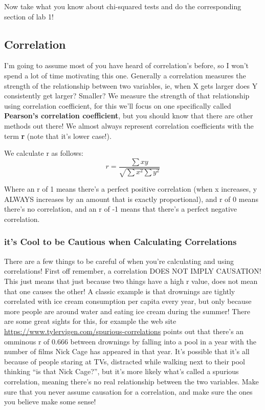 \documentclass[
]{article}
\begin{document}
Now take what you know about chi-squared tests and do the corresponding
section of lab 1!

\hypertarget{correlation}{%
\subsection{Correlation}\label{correlation}}

I'm going to assume most of you have heard of correlation's before, so I
won't spend a lot of time motivating this one. Generally a correlation
measures the strength of the relationship between two variables, ie,
when X gets larger does Y consistently get larger? Smaller? We measure
the strength of that relationship using correlation coefficient, for
this we'll focus on one specifically called \textbf{Pearson's
correlation coefficient}, but you should know that there are other
methods out there! We almost always represent correlation coefficients
with the term \textbf{r} (note that it's lower case!).

We calculate r as follows:
\[r=\frac{\sum{xy}}{\sqrt{\sum{x^2}\sum{y^2}}}\]

Where an r of 1 means there's a perfect positive correlation (when x
increases, y ALWAYS increases by an amount that is exactly
proportional), and r of 0 means there's no correlation, and an r of -1
means that there's a perfect negative correlation.

\hypertarget{its-cool-to-be-cautious-when-calculating-correlations}{%
\subsubsection{it's Cool to be Cautious when Calculating
Correlations}\label{its-cool-to-be-cautious-when-calculating-correlations}}

There are a few things to be careful of when you're calculating and
using correlations! First off remember, a correlation DOES NOT IMPLY
CAUSATION! This just means that just because two things have a high r
value, does not mean that one causes the other! A classic example is
that drownings are tightly correlated with ice cream consumption per
capita every year, but only because more people are around water and
eating ice cream during the summer! There are some great sights for
this, for example the web site
\url{https://www.tylervigen.com/spurious-correlations} points out that
there's an omminous r of 0.666 between drownings by falling into a pool
in a year with the number of films Nick Cage has appeared in that year.
It's possible that it's all because of people staring at TVs, distracted
while walking next to their pool thinking ``is that Nick Cage?'', but
it's more likely what's called a spurious correlation, meaning there's
no real relationship between the two variables. Make sure that you never
assume causation for a correlation, and make sure the ones you believe
make some sense!
\end{document}

